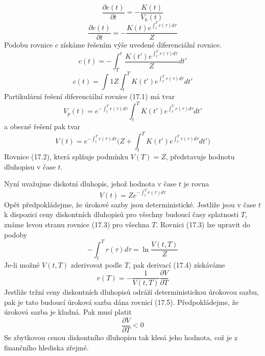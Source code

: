 \documentclass[a4paper]{book}
\begin{document}
\begin{equation*}
\frac{\partial c(t)}{\partial t} = - \frac{K(t)}{V_h(t)}
\end{equation*}
\begin{equation*}
\frac{\partial c(t)}{\partial t} = - \frac{K(t)e^{\int_t^T r(\tau) d\tau}}{Z}
\end{equation*}
Podobu rovnice $c$ získáme řešením výše uvedené diferenciální rovnice.
\begin{equation*}
c(t) = - \int_T^t \frac{K(t')e^{\int_{t'}^T r(\tau) d\tau}}{Z}dt'
\end{equation*}
\begin{equation*}
c(t) = \int{1}{Z} \int_t^T K(t')e^{\int_{t'}^T r(\tau) d\tau}dt'
\end{equation*}
Partikulární řešení diferenciální rovnice (17.1) má tvar
\begin{equation*}
V_p(t) = e^{-\int_t^T r(\tau) d \tau} \int_t^T K(t')e^{\int_{t'}^T r(\tau) d \tau}dt'
\end{equation*}
a obecné řešení pak tvar
\begin{equation}
V(t) = e^{-\int_t^T r(\tau) d \tau}\Bigg(Z + \int_t^T K(t')e^{\int_{t'}^T r(\tau) d \tau}dt' \Bigg)
\end{equation}
Rovnice (17.2), která splňuje podmínku $V(T) = Z$, představuje hodnotu dluhopisu v čase $t$.

Nyní uvažujme diskotní dluhopis, jehož hodnota v čase $t$ je rovna
\begin{equation}
V(t) = Z e^{-\int_t^T r(\tau) d \tau}
\end{equation}
Opět předpokládejme, že úrokové sazby jsou deterministické. Jestliže jsou v čase $t$ k dispozici ceny diskontních dluhopisů pro všechny budoucí časy splatnosti $T$, známe levou stranu rovnice (17.3) pro všechna $T$. Rovnici (17.3) lze upravit do podoby
\begin{equation}
-\int_t^T r(\tau) d \tau = \ln \frac{V(t,T)}{Z}
\end{equation}
Je-li možné $V(t,T)$ zderivovat podle $T$, pak derivací (17.4) získáváme
\begin{equation}
r(T) = - \frac{1}{V(t,T)}\frac{\partial V}{\partial T}
\end{equation}
Jestliže tržní ceny diskontních dluhopisů odráží deterministickou úrokovou sazbu, pak je tato budoucí úroková sazba dána rovnicí (17.5). Předpokládejme, že úroková sazba je kladná. Pak musí platit
\begin{equation*}
\frac{\partial V}{\partial T} < 0
\end{equation*}
Se zbytkovou cenou diskontního dluhopisu tak klesá jeho hodnota, což je z finančního hlediska zřejmé.
\end{document}
